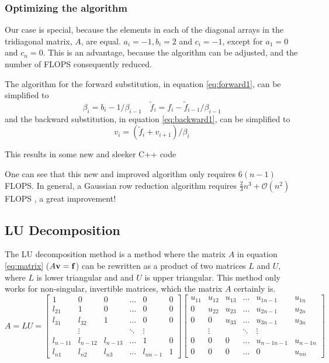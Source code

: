 \documentclass[10pt, a4paper]{amsart}
\begin{document}
\subsubsection{Optimizing the algorithm}

Our case is special, because the elements in each of the diagonal arrays in the
tridiagonal matrix, $A$, are equal. $a_i=-1,b_i=2$ and $c_i=-1$,
except for $a_1=0$ and $c_n=0$. This is an advantage, because the
algorithm can be adjusted, and the number of FLOPS consequently reduced.

The algorithm for the forward substitution, in equation
\ref{eq:forward1}, can be simplified to
\begin{equation}
\beta_i= b_i - 1/\beta_{i-1} \quad \tilde{f}_i=f_i-\tilde{f}_{i-1}/\beta_{i-1}
\end{equation}
and the backward substitution, in equation \ref{eq:backward1}, can be
simplified to
\begin{equation}
v_i = (\tilde{f}_i+v_{i+1})/\beta_i
\end{equation}

This results in some new and sleeker C++ code


One can see that this new and improved algorithm only requires
$6(n-1)$ FLOPS. In general, a Gaussian row reduction algorithm
requires $\frac{2}{3}n^3+\mathcal{O}(n^2)$ FLOPS \cite{morten}, a
great improvement!

\subsection{LU Decomposition}

The LU decomposition method is a method where the matrix $A$ in
equation \ref{eq:matrix} ($A\vb{v}=\vb{f}$) can be rewritten as a product of two matrices
$L$ and $U$, where $L$ is lower triangular and and $U$ is upper
triangular. This method only works for non-singular, invertible
matrices, which the matrix $A$ certainly is. 
\begin{equation}
A = LU =
\begin{bmatrix}
1 & 0 & 0 & \dots & 0 & 0 \\
l_{21} & 1 & 0 & \dots & 0 & 0 \\
l_{31} & l_{32} & 1 & \dots & 0 & 0 \\
  &\vdots & & \ddots & \vdots  & \\
l_{n-11} & l_{n-12} & l_{n-13} & \dots & 1 & 0 \\  
l_{n1} & l_{n2} & l_{n3} & \dots & l_{nn-1} & 1
\end{bmatrix}
\begin{bmatrix}
u_{11} & u_{12} & u_{13} & \dots & u_{1n-1} & u_{1n} \\
0 & u_{22} & u_{23} & \dots & u_{2n-1} & u_{2n} \\
0 & 0 & u_{33} & \dots & u_{3n-1} & u_{3n} \\
  &\vdots & & \ddots & \vdots  & \\
0 & 0 & 0 & \dots & u_{n-1n-1} & u_{n-1n} \\  
0 & 0 & 0 & \dots & 0 & u_{nn}
\end{bmatrix}
\end{equation}
\end{document}
